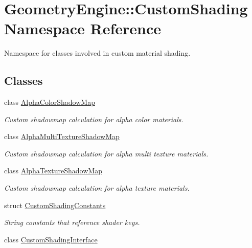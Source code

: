 \hypertarget{namespace_geometry_engine_1_1_custom_shading}{}\section{Geometry\+Engine\+::Custom\+Shading Namespace Reference}
\label{namespace_geometry_engine_1_1_custom_shading}


Namespace for classes involved in custom material shading.  


\subsection*{Classes}
\begin{DoxyCompactItemize}
\item 
class \mbox{\hyperlink{class_geometry_engine_1_1_custom_shading_1_1_alpha_color_shadow_map}{Alpha\+Color\+Shadow\+Map}}
\begin{DoxyCompactList}\small\item\em Custom shadowmap calculation for alpha color materials. \end{DoxyCompactList}\item 
class \mbox{\hyperlink{class_geometry_engine_1_1_custom_shading_1_1_alpha_multi_texture_shadow_map}{Alpha\+Multi\+Texture\+Shadow\+Map}}
\begin{DoxyCompactList}\small\item\em Custom shadowmap calculation for alpha multi texture materials. \end{DoxyCompactList}\item 
class \mbox{\hyperlink{class_geometry_engine_1_1_custom_shading_1_1_alpha_texture_shadow_map}{Alpha\+Texture\+Shadow\+Map}}
\begin{DoxyCompactList}\small\item\em Custom shadowmap calculation for alpha texture materials. \end{DoxyCompactList}\item 
struct \mbox{\hyperlink{struct_geometry_engine_1_1_custom_shading_1_1_custom_shading_constants}{Custom\+Shading\+Constants}}
\begin{DoxyCompactList}\small\item\em String constants that reference shader keys. \end{DoxyCompactList}\item 
class \mbox{\hyperlink{class_geometry_engine_1_1_custom_shading_1_1_custom_shading_interface}{Custom\+Shading\+Interface}}

\end{DoxyCompactItemize}
